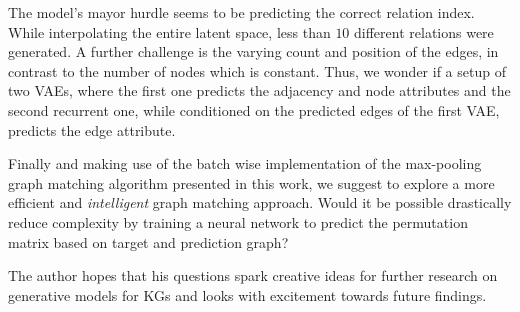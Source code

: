 The model's mayor hurdle seems to be predicting the correct relation index. While interpolating the entire latent space, less than $10$ different relations were generated. A further challenge is the varying count and position of the edges, in contrast to the number of nodes which is constant. Thus, we wonder if a setup of two VAEs, where the first one predicts the adjacency and node attributes and the second recurrent one, while conditioned on the predicted edges of the first VAE, predicts the edge attribute.

Finally and making use of the batch wise implementation of the max-pooling graph matching algorithm presented in this work, we suggest to explore a more efficient and \textit{intelligent} graph matching approach. Would it be possible drastically reduce complexity by training a neural network to predict the permutation matrix based on target and prediction graph?




The author hopes that his questions spark creative ideas for further research on generative models for KGs and looks with excitement towards future findings.

